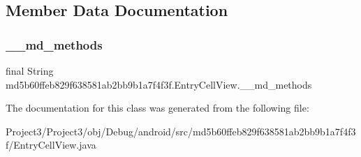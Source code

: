 \subsection{Member Data Documentation}
\mbox{\label{classmd5b60ffeb829f638581ab2bb9b1a7f4f3f_1_1EntryCellView_a58b79ef4732c97fcac8b0839aabf25e6}} 
\subsubsection{\texorpdfstring{\+\_\+\+\_\+md\+\_\+methods}{\_\_md\_methods}}
{\footnotesize\ttfamily final String md5b60ffeb829f638581ab2bb9b1a7f4f3f.\+Entry\+Cell\+View.\+\_\+\+\_\+md\+\_\+methods\hspace{0.3cm}{\ttfamily [static]}}



The documentation for this class was generated from the following file\+:\begin{DoxyCompactItemize}
\item 
Project3/\+Project3/obj/\+Debug/android/src/md5b60ffeb829f638581ab2bb9b1a7f4f3f/Entry\+Cell\+View.\+java\end{DoxyCompactItemize}
